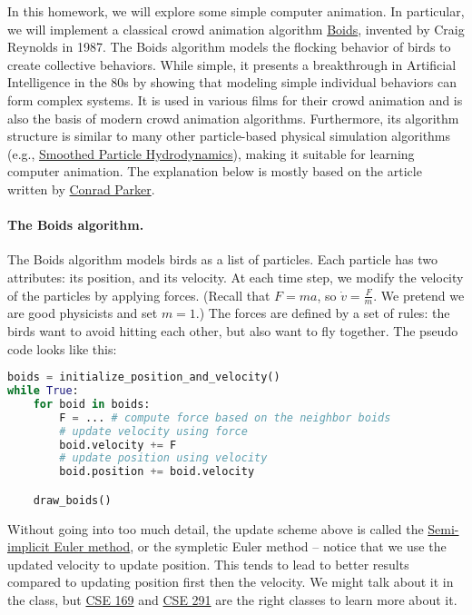 




In this homework, we will explore some simple computer animation. In particular, we will implement a classical crowd animation algorithm \href{https://en.wikipedia.org/wiki/Boids}{Boids}, invented by Craig Reynolds in 1987. The Boids algorithm models the flocking behavior of birds to create collective behaviors. While simple, it presents a breakthrough in Artificial Intelligence in the 80s by showing that modeling simple individual behaviors can form complex systems. It is used in various films for their crowd animation and is also the basis of modern crowd animation algorithms. Furthermore, its algorithm structure is similar to many other particle-based physical simulation algorithms (e.g., \href{https://en.wikipedia.org/wiki/Smoothed-particle_hydrodynamics}{Smoothed Particle Hydrodynamics}), making it suitable for learning computer animation. The explanation below is mostly based on the article written by \href{https://vergenet.net/~conrad/boids/pseudocode.html}{Conrad Parker}.

\paragraph{The Boids algorithm.} The Boids algorithm models birds as a list of particles. Each particle has two attributes: its position, and its velocity. At each time step, we modify the velocity of the particles by applying forces. (Recall that $F = ma$, so $\dot{v} = \frac{F}{m}$. We pretend we are good physicists and set $m=1$.) The forces are defined by a set of rules: the birds want to avoid hitting each other, but also want to fly together. The pseudo code looks like this:
\begin{lstlisting}[language=Python]
boids = initialize_position_and_velocity()
while True:
	for boid in boids:
		F = ... # compute force based on the neighbor boids
		# update velocity using force
		boid.velocity += F
		# update position using velocity
		boid.position += boid.velocity

	draw_boids()
\end{lstlisting}
Without going into too much detail, the update scheme above is called the \href{https://en.wikipedia.org/wiki/Semi-implicit_Euler_method}{Semi-implicit Euler method}, or the sympletic Euler method -- notice that we use the updated velocity to update position. This tends to lead to better results compared to updating position first then the velocity. We might talk about it in the class, but \href{https://cseweb.ucsd.edu/classes/wi20/cse169-a/index.html}{CSE 169} and \href{https://cseweb.ucsd.edu/~alchern/teaching/cse291_sp23/}{CSE 291} are the right classes to learn more about it.

